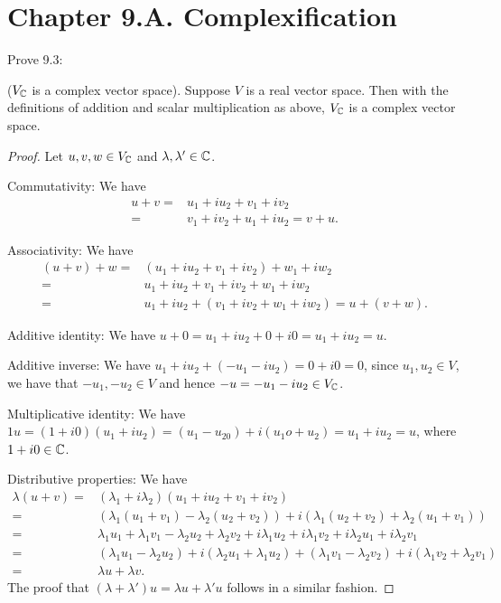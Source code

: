 \section*{Chapter 9.A. Complexification}


\begin{exercise}{1}
  Prove 9.3:

  ($V_{\mathbb{C}}$ is a complex vector space). Suppose $V$ is a real vector space. Then with the definitions of addition and scalar multiplication as above, $V_{\mathbb{C}}$ is a complex vector space.
\end{exercise}
\begin{proof}
 Let $u,v,w\in V_{\mathbb{C}}$ and $\lambda,\lambda'\in\mathbb{C}$.

 Commutativity: We have 
 \begin{align*}
     u+v =& 
     u_1+iu_2+v_1+iv_2\\ 
     =& v_1+iv_2+u_1+iu_2 =v+u.
 \end{align*}

 Associativity: We have 
 \begin{align*}
    (u+v)+w =& 
    (u_1+iu_2+v_1+iv_2)+w_1+iw_2\\ 
    =& u_1+iu_2+v_1+iv_2+w_1+iw_2\\ 
    =& u_1+iu_2+(v_1+iv_2+w_1+iw_2) =u+(v+w).   
 \end{align*}

 Additive identity: We have $u+0 = u_1+iu_2+0+i0 =u_1+iu_2 =u$.

 Additive inverse: We have $u_1+iu_2+(-u_1-iu_2) =0+i0 =0$, since $u_1,u_2\in V$, we have that $-u_1,-u_2\in V$ and hence $-u=-u_1-iu_2\in V_{\mathbb{C}}$.

 Multiplicative identity: We have $1u =(1+i0)(u_1+iu_2) =(u_1-u_20)+i(u_1o+u_2) =u_1+iu_2 =u$, where $1+i0\in\mathbb{C}$.

 Distributive properties: We have
 \begin{align*}
     \lambda(u+v) =& 
     (\lambda_1+i\lambda_2)(u_1+iu_2+v_1+iv_2)\\ 
     =& (\lambda_1(u_1+v_1)-\lambda_2(u_2+v_2))
     +i(\lambda_1(u_2+v_2)+\lambda_2(u_1+v_1))\\
     =& \lambda_1u_1+\lambda_1v_1-\lambda_2u_2+\lambda_2v_2
     +i\lambda_1u_2+i\lambda_1v_2+i\lambda_2u_1+i\lambda_2v_1\\ 
     =& (\lambda_1u_1-\lambda_2u_2)+i(\lambda_2u_1+\lambda_1u_2)
     +(\lambda_1v_1-\lambda_2v_2)+i(\lambda_1v_2+\lambda_2v_1)\\ 
     =& \lambda u + \lambda v.
 \end{align*} 
 The proof that $(\lambda+\lambda')u =\lambda u+\lambda' u$ follows in a similar fashion.
\end{proof}

